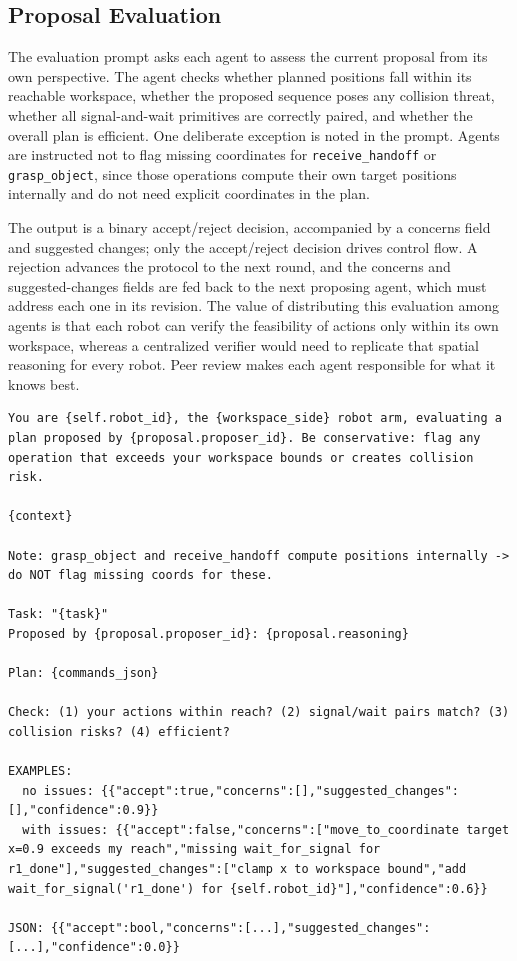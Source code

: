 \subsection{Proposal Evaluation}
The evaluation prompt asks each agent to assess the current proposal from its own perspective. The agent checks whether planned positions fall within its reachable workspace, whether the proposed sequence poses any collision threat, whether all signal-and-wait primitives are correctly paired, and whether the overall plan is efficient. One deliberate exception is noted in the prompt. Agents are instructed not to flag missing coordinates for \texttt{receive\_handoff} or \texttt{grasp\_object}, since those operations compute their own target positions internally and do not need explicit coordinates in the plan.

The output is a binary accept/reject decision, accompanied by a concerns field and suggested changes; only the accept/reject decision drives control flow. A rejection advances the protocol to the next round, and the concerns and suggested-changes fields are fed back to the next proposing agent, which must address each one in its revision. The value of distributing this evaluation among agents is that each robot can verify the feasibility of actions only within its own workspace, whereas a centralized verifier would need to replicate that spatial reasoning for every robot. Peer review makes each agent responsible for what it knows best.

\begin{lstlisting}[caption={Proposal evaluation prompt for decentralized plan validation, workspace constraint verification, and safety checking.}, extendedchars=true]
You are {self.robot_id}, the {workspace_side} robot arm, evaluating a plan proposed by {proposal.proposer_id}. Be conservative: flag any operation that exceeds your workspace bounds or creates collision risk.

{context}

Note: grasp_object and receive_handoff compute positions internally -> do NOT flag missing coords for these.

Task: "{task}"
Proposed by {proposal.proposer_id}: {proposal.reasoning}

Plan: {commands_json}

Check: (1) your actions within reach? (2) signal/wait pairs match? (3) collision risks? (4) efficient?

EXAMPLES:
  no issues: {{"accept":true,"concerns":[],"suggested_changes":[],"confidence":0.9}}
  with issues: {{"accept":false,"concerns":["move_to_coordinate target x=0.9 exceeds my reach","missing wait_for_signal for r1_done"],"suggested_changes":["clamp x to workspace bound","add wait_for_signal('r1_done') for {self.robot_id}"],"confidence":0.6}}

JSON: {{"accept":bool,"concerns":[...],"suggested_changes":[...],"confidence":0.0}}
\end{lstlisting}


